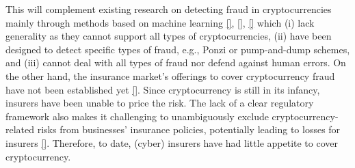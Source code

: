 This will complement existing research on detecting fraud in cryptocurrencies mainly through methods based on machine learning 
% 
\href{https://core.ac.uk/download/pdf/225316624.pdf}{[\printcntr]}, \href{https://ieeexplore.ieee.org/stamp/stamp.jsp?tp=&arnumber=8946232&tag=1}{[\printcntr]}, \href{https://link.springer.com/content/pdf/10.1007/978-3-031-06791-4_18.pdf}{[\printcntr]} which (i) lack generality as they cannot support all types of cryptocurrencies, (ii) have been designed to detect specific types of fraud, e.g., Ponzi or pump-and-dump schemes, and (iii) cannot deal with all types of fraud nor defend against human errors. 
% 
On the other hand, the insurance market’s offerings to cover cryptocurrency fraud have not been established yet \href{https://www.rmmagazine.com/articles/article/2022/06/01/finding-coverage-for-cryptocurrency-losses}{[\printcntr]}. Since cryptocurrency is still in its infancy, insurers have been unable to price the risk. The lack of a clear regulatory framework also makes it challenging to unambiguously exclude cryptocurrency-related risks from businesses’ insurance policies, potentially leading to losses for insurers \href{https://news.bloomberglaw.com/insurance/crypto-risks-prompt-uptick-in-insurance-exclusions}{[\printcntr]}. Therefore, to date, (cyber) insurers have had little appetite to cover cryptocurrency. 



%
%



